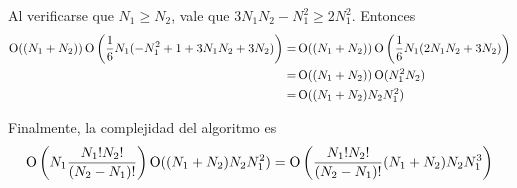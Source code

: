 Al verificarse que $N_1 \geq N_2$, vale que $3N_1N_2 - N_1^2 \geq 2N_1^2$.
Entonces
\begin{align*}
\operatorname{O}((N_1 + N_2))  \operatorname{O}\left(\frac{1}{6}N_1(-N_1^2 + 1 + 3N_1N_2 + 3N_2)\right)
=& \operatorname{O}((N_1 + N_2))  \operatorname{O}\left(\frac{1}{6}N_1(2N_1N_2 + 3N_2)\right) \\
=& \operatorname{O}((N_1 + N_2))  \operatorname{O}(N_1^2N_2) \\
=& \operatorname{O}((N_1 + N_2)  N_2  N_1^2)
\end{align*}

Finalmente, la complejidad del algoritmo es
\[
\operatorname{O}\left(N_1 \frac{N_1!  N_2!}{(N_2 - N_1)!}\right) \operatorname{O}((N_1 + N_2)  N_2  N_1^2) =
\operatorname{O}\left(\frac{N_1!  N_2!}{(N_2 - N_1)!} (N_1 + N_2)  N_2  N_1^3\right)
\]


